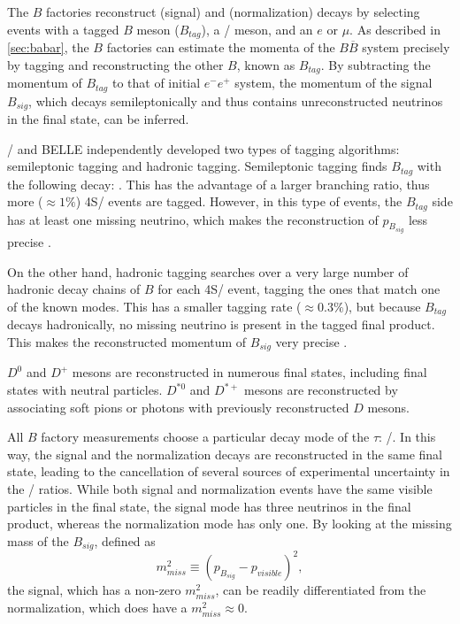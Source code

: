 The $B$ factories reconstruct \BDDstMode{\tau} (signal) and \BDDstMode{\ell}
(normalization) decays by selecting events with a tagged $B$ meson ($B_{tag}$),
a \DDst/ meson, and an $e$ or $\mu$.
As described in \autoref{sec:babar}, the $B$ factories can estimate the momenta
of the $B \overline{B}$ system precisely by tagging and reconstructing the other
$B$, known as $B_{tag}$.
By subtracting the momentum of $B_{tag}$ to that of initial $e^-e^+$ system, the
momentum of the signal $B_{sig}$, which decays semileptonically and thus
contains unreconstructed neutrinos in the final state, can be inferred.

\BaBar/ and BELLE independently developed two types of tagging algorithms:
semileptonic tagging and hadronic tagging.
Semileptonic tagging finds $B_{tag}$ with the following decay: \BDDstMode{\ell}.
This has the advantage of a larger branching ratio, thus more ($\approx 1\%$)
\Y4S/ events are tagged.
However, in this type of events, the $B_{tag}$ side has at least one missing
neutrino, which makes the reconstruction of $p_{B_{sig}}$ less
precise \cite{Ciezarek:2017yzh}.

On the other hand, hadronic tagging searches over a very large number of
hadronic decay chains of $B$ for each \Y4S/ event, tagging the ones that match
one of the known modes.
This has a smaller tagging rate ($\approx 0.3\%$), but because $B_{tag}$ decays
hadronically, no missing neutrino is present in the tagged final product.
This makes the reconstructed momentum of $B_{sig}$ very
precise \cite{Lees:2013uzd,Ciezarek:2017yzh}.

$D^{0}$ and $D^{+}$ mesons are reconstructed in numerous final states, including
final states with neutral particles.
$D^{*0}$ and $D^{*+}$ mesons are reconstructed by associating soft pions or
photons with previously reconstructed $D$ mesons.

All $B$ factory measurements choose a particular decay mode of the $\tau$:
\TauLepMode/.
In this way, the signal and the normalization \BDDstMode{\ell} decays are
reconstructed in the same final state, leading to the cancellation of several
sources of experimental uncertainty in the \RDDst/ ratios.
While both signal and normalization events have the same visible particles in
the final state, the signal mode has three neutrinos in the final product,
whereas the normalization mode has only one.
By looking at the missing mass of the $B_{sig}$, defined as
\begin{equation}
    m^2_{miss} \equiv \left(p_{B_{sig}} - p_{visible}\right)^2,
\end{equation}
the signal, which has a non-zero $m^2_{miss}$, can be readily differentiated
from the normalization, which does have a $m^2_{miss} \approx 0$.

